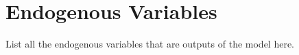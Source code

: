 \begin{table}[htbp]
\begin{threeparttable}
\begin{tabular}{>{\footnotesize}c |>{\footnotesize}l |>{\footnotesize}c}

        \hline\hline
      \end{tabular}
      \end{threeparttable}
    \end{table}


\section{Endogenous Variables}\label{SecExEnd_Endog}

  List all the endogenous variables that are outputs of the model here.

